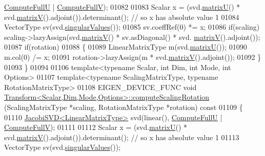 \begin{DoxyCode}
      \hyperlink{group__enums_ggae3e239fb70022eb8747994cf5d68b4a9a2b4f91ca5859a4159dbfe8090043817f}{ComputeFullU} | \hyperlink{group__enums_ggae3e239fb70022eb8747994cf5d68b4a9a52c6f7e80bbf9a42297c88f700245b51}{ComputeFullV});
01082 
01083   Scalar x = (svd.\hyperlink{group___s_v_d___module_afc7fe1546b0f6e1801b86f22f5664cb8}{matrixU}() * svd.\hyperlink{group___s_v_d___module_a245a453b5e7347f737295c23133238c4}{matrixV}().adjoint()).determinant(); \textcolor{comment}{// so x has absolute
       value 1}
01084   VectorType sv(svd.\hyperlink{group___s_v_d___module_a4e7bac123570c348f7ed6be909e1e474}{singularValues}());
01085   sv.coeffRef(0) *= x;
01086   \textcolor{keywordflow}{if}(scaling) scaling->lazyAssign(svd.\hyperlink{group___s_v_d___module_a245a453b5e7347f737295c23133238c4}{matrixV}() * sv.asDiagonal() * svd.
      \hyperlink{group___s_v_d___module_a245a453b5e7347f737295c23133238c4}{matrixV}().adjoint());
01087   \textcolor{keywordflow}{if}(rotation)
01088   \{
01089     LinearMatrixType m(svd.\hyperlink{group___s_v_d___module_afc7fe1546b0f6e1801b86f22f5664cb8}{matrixU}());
01090     m.col(0) /= x;
01091     rotation->lazyAssign(m * svd.\hyperlink{group___s_v_d___module_a245a453b5e7347f737295c23133238c4}{matrixV}().adjoint());
01092   \}
01093 \}
01094 
01106 \textcolor{keyword}{template}<\textcolor{keyword}{typename} Scalar, \textcolor{keywordtype}{int} Dim, \textcolor{keywordtype}{int} Mode, \textcolor{keywordtype}{int} Options>
01107 \textcolor{keyword}{template}<\textcolor{keyword}{typename} ScalingMatrixType, \textcolor{keyword}{typename} RotationMatrixType>
01108 EIGEN\_DEVICE\_FUNC \textcolor{keywordtype}{void} 
      \hyperlink{group___geometry___module_a88f214d6340a4ced22d673d54661e16c}{Transform<Scalar,Dim,Mode,Options>::computeScalingRotation}
      (ScalingMatrixType *scaling, RotationMatrixType *rotation)\textcolor{keyword}{ const}
01109 \textcolor{keyword}{}\{
01110   \hyperlink{group___s_v_d___module_class_eigen_1_1_jacobi_s_v_d}{JacobiSVD<LinearMatrixType>} svd(linear(), 
      \hyperlink{group__enums_ggae3e239fb70022eb8747994cf5d68b4a9a2b4f91ca5859a4159dbfe8090043817f}{ComputeFullU} | \hyperlink{group__enums_ggae3e239fb70022eb8747994cf5d68b4a9a52c6f7e80bbf9a42297c88f700245b51}{ComputeFullV});
01111 
01112   Scalar x = (svd.\hyperlink{group___s_v_d___module_afc7fe1546b0f6e1801b86f22f5664cb8}{matrixU}() * svd.\hyperlink{group___s_v_d___module_a245a453b5e7347f737295c23133238c4}{matrixV}().adjoint()).determinant(); \textcolor{comment}{// so x has absolute
       value 1}
01113   VectorType sv(svd.\hyperlink{group___s_v_d___module_a4e7bac123570c348f7ed6be909e1e474}{singularValues}());

\end{DoxyCode}

